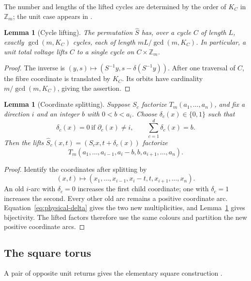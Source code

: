 \documentclass[11pt,reqno]{amsart}
\numberwithin{equation}{section}
\newtheorem{lemma}[theorem]{Lemma}
\theoremstyle{definition}
\theoremstyle{remark}
\newcommand{\Zm}{\mathbb Z_m}
\begin{document}
The number and lengths of the lifted cycles are determined by the
order of $K_C$ in $\Zm$; the unit case appears in
\cite[Lemma~8.1]{ParkVtwo}.

\begin{lemma}[Cycle lifting]\label{lem:lift}
The permutation $\widehat S$ has, over a cycle $C$ of length $L$, exactly
$\gcd(m,K_C)$ cycles, each of length $mL/\gcd(m,K_C)$. In particular, a unit total
voltage lifts $C$ to a single cycle on $C\times\Zm$.
\end{lemma}
\begin{proof}
The inverse is $(y,s)\mapsto(S^{-1}y,s-\delta(S^{-1}y))$. After one traversal of
$C$, the fibre coordinate is translated by $K_C$. Its orbits have cardinality
$m/\gcd(m,K_C)$, giving the assertion.
\end{proof}

\begin{lemma}[Coordinate splitting]\label{lem:physical}
Suppose $S_c$ factorize $T_m(a_1,\ldots,a_n)$, and fix a direction $i$ and an
integer $b$ with $0<b<a_i$. Choose $\delta_c(x)\in\{0,1\}$ such that
\begin{equation}\label{eq:physical-delta}
 \delta_c(x)=0\ \text{if }\partial_c(x)\ne i,
 \qquad \sum_{c=1}^d\delta_c(x)=b.
\end{equation}
Then the lifts $\widehat S_c(x,t)=(S_cx,t+\delta_c(x))$ factorize
\[
 T_m(a_1,\ldots,a_{i-1},a_i-b,b,a_{i+1},\ldots,a_n).
\]
\end{lemma}
\begin{proof}
Identify the coordinates after splitting by
\begin{equation}\label{eq:sum-sheet}
 (x,t)\longmapsto
 (x_1,\ldots,x_{i-1},x_i-t,t,x_{i+1},\ldots,x_n).
\end{equation}
An old $i$-arc with $\delta_c=0$ increases the first child coordinate; one with
$\delta_c=1$ increases the second. Every other old arc remains a positive
coordinate arc. Equation~\eqref{eq:physical-delta} gives the two new
multiplicities, and Lemma~\ref{lem:lift} gives bijectivity. The lifted factors
therefore use the same colours and partition the new positive coordinate arcs.
\end{proof}

\subsection{The square torus}
A pair of opposite unit returns gives the elementary square construction
\cite[Theorem~4.1]{ParkVtwo}.
\end{document}
